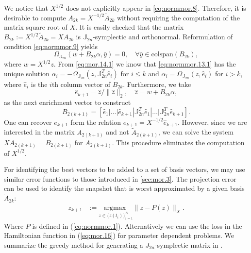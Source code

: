 We notice that $X^{1/2}$ does not explicitly appear in \cref{eq:normmor.8}. Therefore, it is desirable to compute $A_{2k} = X^{-1/2} \tilde A_{2k}$ without requiring the computation of the matrix square root of $X$. It is easily checked that the matrix $B_{2k}:=X^{1/2} \tilde A_{2k} = XA_{2k}$ is $\mathbb J_{2n}$-symplectic and orthonormal. Reformulation of condition \cref{eq:normmor.9} yields
\begin{equation} \label{eq:normmor.13.1}
	\Omega_{\mathbb J_{2n}}\left( w + B_{2k} \alpha, \bar y \right) = 0, \quad \forall \bar y \in \text{colspan}(B_{2k}),
\end{equation}
where $w = X^{1/2}z$. From \cref{eq:mor.14.1} we know that \cref{eq:normmor.13.1} has the unique solution $\alpha_i = - \Omega_{\mathbb J_{2n}}(z,\mathbb J_{2n}^T \hat e_i)$ for $i\leq k$ and $\alpha_i = \Omega_{\mathbb J_{2n}}(z,\hat e_i)$ for $i>k$, where $\hat e_i$ is the $i$th column vector of $B_{2k}$. Furthermore, we take 
\begin{equation}
	\hat e_{k+1} = \hat z / \| \hat z \|_2, \quad \hat z = w + B_{2k} \alpha,
\end{equation}
as the next enrichment vector to construct
\begin{equation}
	B_{2(k+1)} = [ \hat e_1 | \dots | \hat e_{k+1} | \mathbb J_{2n}^T \hat e_1 | \dots | \mathbb J_{2n}^T \hat e_{k+1} ].
\end{equation}
One can recover $e_{k+1}$ form the relation $e_{k+1} = X^{-1/2} \hat e_{k+1}$. However, since we are interested in the matrix $A_{2(k+1)}$ and not $\tilde A_{2(k+1)}$, we can solve the system $XA_{2(k+1)} = B_{2(k+1)}$ for $A_{2(k+1)}$. This procedure eliminates the computation of $X^{1/2}$.

For identifying the best vectors to be added to a set of basis vectors, we may use similar error functions to those introduced in \cref{sec:mor.3}. The projection error can be used to identify the snapshot that is worst approximated by a given basis $\tilde A_{2k}$:
\begin{equation} \label{eq:normmor.14}
\begin{aligned}
	z_{k+1} &:= \underset{z\in\{ z(t_i)\}_{i=1}^{N}}{\text{argmax } }\| z - P(z) \|_X.
\end{aligned}
\end{equation}
Where $P$ is defined in (\ref{eq:normmor.1}). Alternatively we can use the loss in the Hamiltonian function in (\ref{eq:mor.16}) for parameter dependent problems. We summarize the greedy method for generating a $J_{2n}$-symplectic matrix in .

